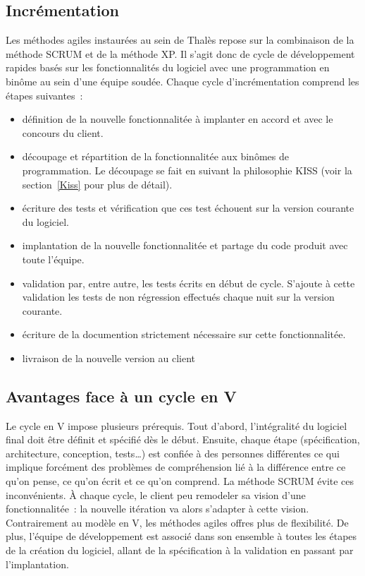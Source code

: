 \documentclass[a4paper,10pt]{article}
\begin{document}
\subsection{Incrémentation}

Les méthodes agiles instaurées au sein de Thalès repose sur la combinaison
de la méthode SCRUM et de la méthode XP. Il s'agit donc de cycle de 
développement rapides basés sur les fonctionnalités du logiciel avec 
une programmation en binôme au sein d'une équipe soudée. Chaque cycle
d'incrémentation comprend les étapes suivantes~:

\begin{itemize}
\item définition de la nouvelle fonctionnalitée à implanter en accord et
avec le concours du client.
\item découpage et répartition de la fonctionnalitée aux binômes de 
programmation. Le découpage se fait en suivant la philosophie KISS (voir
la section~\ref{Kiss} pour plus de détail).
\item écriture des tests et vérification que ces test échouent sur la
version courante du logiciel.
\item implantation de la nouvelle fonctionnalitée et partage du code produit
avec toute l'équipe.
\item validation par, entre autre, les tests écrits en début de cycle. 
S'ajoute à cette validation les tests de non régression effectués chaque 
nuit sur la version courante.
\item écriture de la documention strictement nécessaire sur cette 
fonctionnalitée.
\item livraison de la nouvelle version au client
\end{itemize}

\subsection{Avantages face à un cycle en V}

Le cycle en V impose plusieurs prérequis. Tout d'abord, l'intégralité du
logiciel final doit être définit et spécifié dès le début. Ensuite, chaque
étape (spécification, architecture, conception, tests…) est confiée à des
personnes différentes ce qui implique forcément des problèmes de 
compréhension lié à la différence entre ce qu'on pense, ce qu'on écrit et
ce qu'on comprend. La méthode SCRUM évite ces inconvénients. À chaque cycle,
le client peu remodeler sa vision d'une fonctionnalitée~: la nouvelle 
itération va alors s'adapter à cette vision. Contrairement au modèle en V, 
les méthodes agiles offres plus de flexibilité. De plus, l'équipe de 
développement est associé dans son ensemble à toutes les étapes de la 
création du logiciel, allant de la spécification à la validation en passant
par l'implantation.
\end{document}
